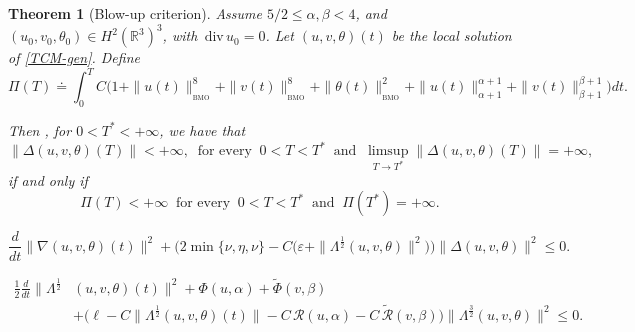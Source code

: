 \documentclass[10pt,a4paper]{amsart}
\newtheorem{thm}{Theorem}
\newcommand{\R}{\mathbb{R}}
\providecommand{\dv}{\,\mathrm{div}\,}
\begin{document}
    \begin{thm}[Blow-up criterion] \label{th:bu criterion}  Assume 
      $5/2\leq \alpha, \beta < 4$, and
      $(u_0, v_0, \theta_0) \in H^2(\R^3)^3$, with $\dv u_0 = 0$. Let $(u,v,\theta)(t)$ be the local solution of \eqref{TCM-gen}. Define
  \begin{equation}
  \label{e:Pi}
  \Pi(T) \doteq 
  \int_0^T C \big(1
      +\|u(t)\|_{{}_{\textrm{BMO}}}^{8} + \|v(t)\|_{{}_{\textrm{BMO}}}^{8} +
      \|\theta(t)\|_{{}_{\textrm{BMO}}}^2 +
      \|u(t)\|^{\alpha+1}_{\alpha+1}+\|v(t)\|^{\beta+1}_{\beta+1}
      \big)dt.
  \end{equation}
      
      Then , for $0< T^\ast < +\infty$, we have that  
  \begin{equation*}
  \|\Delta (u, v, \theta) (T)\| < +\infty, \ \mbox{ for every } \ 0<T< T^\ast \ \mbox{ and } \ \limsup_{T \to {T^\ast}} \|\Delta (u, v, \theta) (T)\|=+\infty,
  \end{equation*}
  if and only if 
  \begin{equation*}
  \Pi(T) < +\infty \ \mbox{ for every } \ 0<T<T^\ast \ \mbox{ and } \ \Pi(T^\ast) =+\infty.
  \end{equation*}
  \end{thm}

\begin{equation} \label{stima-u-v-H1-chiusa}
  \frac{d}{dt} \|\nabla (u,v, \theta)(t)\|^2 + \Big(2\min\{\nu, \eta, \nu\} -
  C\big(\varepsilon + \|\Lambda^{\frac{1}{2}}
  (u,v,\theta)\|^2\big)\Big)\|\Delta (u, v, \theta)\|^2 \leq 0.
\end{equation}

\begin{equation} \label{e:key2}
  \begin{aligned}
    \frac{1}{2} \frac{d}{dt}  \|\Lambda^{\frac{1}{2}} & (u, v,
    \theta) (t) \|^2  +  \Phi(u,\alpha)+ \tilde \Phi (v,\beta)
    \\
    & + \big(\ell - C \|\Lambda^{\frac{1}{2}} (u, v, \theta) (t) \| -
    C\,\mathcal R(u,\alpha) -C\, \tilde{\mathcal R}(v,\beta)\big) \|\Lambda^{\frac{3}{2}} (u, v,
    \theta)\|^2 \leq 0.
  \end{aligned}
\end{equation}
\end{document}
